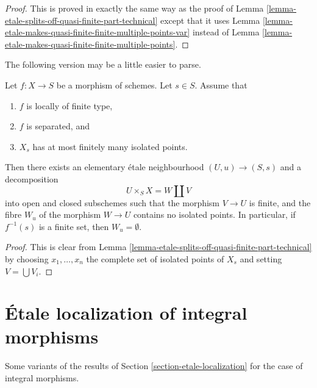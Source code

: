 \begin{proof}
This is proved in exactly the same way as the proof of
Lemma \ref{lemma-etale-splits-off-quasi-finite-part-technical} except that it
uses Lemma \ref{lemma-etale-makes-quasi-finite-finite-multiple-points-var}
instead of Lemma \ref{lemma-etale-makes-quasi-finite-finite-multiple-points}.
\end{proof}

\noindent
The following version may be a little easier to parse.

\begin{lemma}
\label{lemma-etale-splits-off-quasi-finite-part}
Let $f : X \to S$ be a morphism of schemes.
Let $s \in S$. Assume that
\begin{enumerate}
\item $f$ is locally of finite type,
\item $f$ is separated, and
\item $X_s$ has at most finitely many isolated points.
\end{enumerate}
Then there exists an elementary \'etale neighbourhood $(U, u) \to (S, s)$
and a decomposition
$$
U \times_S X = W \amalg V
$$
into open and closed subschemes such that the morphism
$V \to U$ is finite, and the fibre $W_u$ of the
morphism $W \to U$ contains no isolated points.
In particular, if $f^{-1}(s)$ is a finite set, then $W_u = \emptyset$.
\end{lemma}

\begin{proof}
This is clear from
Lemma \ref{lemma-etale-splits-off-quasi-finite-part-technical}
by choosing $x_1, \ldots, x_n$ the complete set of
isolated points of $X_s$ and setting $V = \bigcup V_i$.
\end{proof}






\section{\'Etale localization of integral morphisms}
\label{section-etale-localization-integral}

\noindent
Some variants of the results of Section \ref{section-etale-localization}
for the case of integral morphisms.

